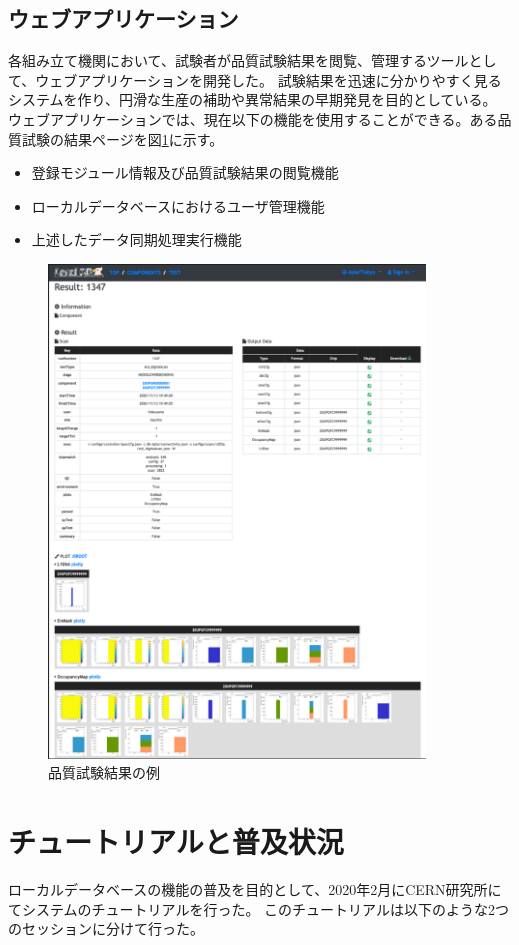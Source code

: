 \subsection{ウェブアプリケーション}
各組み立て機関において、試験者が品質試験結果を閲覧、管理するツールとして、ウェブアプリケーションを開発した。
試験結果を迅速に分かりやすく見るシステムを作り、円滑な生産の補助や異常結果の早期発見を目的としている。
ウェブアプリケーションでは、現在以下の機能を使用することができる。ある品質試験の結果ページを図\ref{viewer_result}に示す。

\begin{itemize}
  \item 登録モジュール情報及び品質試験結果の閲覧機能
  \item ローカルデータベースにおけるユーザ管理機能
  \item 上述したデータ同期処理実行機能
\end{itemize}

\begin{figure}[bpt]\centering
\includegraphics[width=10cm]{viewer_result}
\caption[品質試験結果の例]{品質試験結果の例}
\label{viewer_result}
\end{figure}

\newpage
\section{チュートリアルと普及状況}
ローカルデータベースの機能の普及を目的として、2020年2月にCERN研究所にてシステムのチュートリアルを行った。
このチュートリアルは以下のような2つのセッションに分けて行った。

